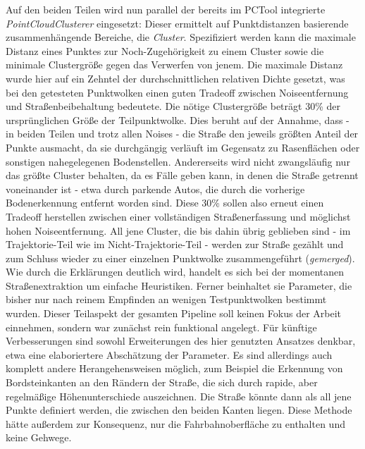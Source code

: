 Auf den beiden Teilen wird nun parallel der bereits im PCTool integrierte \textit{PointCloudClusterer} eingesetzt: Dieser ermittelt auf Punktdistanzen basierende zusammenhängende Bereiche, die \textit{Cluster}. Spezifiziert werden kann die maximale Distanz eines Punktes zur Noch-Zugehörigkeit zu einem Cluster sowie die minimale Clustergröße gegen das Verwerfen von jenem. 
Die maximale Distanz wurde hier auf ein Zehntel der durchschnittlichen relativen Dichte gesetzt, was bei den getesteten Punktwolken einen guten Tradeoff zwischen Noiseentfernung und Straßenbeibehaltung bedeutete. Die nötige Clustergröße beträgt 30\% der ursprünglichen Größe der Teilpunktwolke. Dies beruht auf der Annahme, dass - in beiden Teilen und trotz allen Noises - die Straße den jeweils größten Anteil der Punkte ausmacht, da sie durchgängig verläuft im Gegensatz zu Rasenflächen oder sonstigen nahegelegenen Bodenstellen. Andererseits wird nicht zwangsläufig nur das größte Cluster behalten, da es Fälle geben kann, in denen die Straße getrennt voneinander ist - etwa durch parkende Autos, die durch die vorherige Bodenerkennung entfernt worden sind. Diese 30\% sollen also erneut einen Tradeoff herstellen zwischen einer vollständigen Straßenerfassung und möglichst hohen Noiseentfernung. All jene Cluster, die bis dahin übrig geblieben sind - im Trajektorie-Teil wie im Nicht-Trajektorie-Teil - werden zur Straße gezählt und zum Schluss wieder zu einer einzelnen Punktwolke zusammengeführt (\textit{gemerged}). \\
Wie durch die Erklärungen deutlich wird, handelt es sich bei der momentanen Straßenextraktion um einfache Heuristiken. Ferner beinhaltet sie Parameter, die bisher nur nach reinem Empfinden an wenigen Testpunktwolken bestimmt wurden. Dieser Teilaspekt der gesamten Pipeline soll keinen Fokus der Arbeit einnehmen, sondern war zunächst rein funktional angelegt. Für künftige Verbesserungen sind sowohl Erweiterungen des hier genutzten Ansatzes denkbar, etwa eine elaboriertere Abschätzung der Parameter. Es sind allerdings auch komplett andere Herangehensweisen möglich, zum Beispiel die Erkennung von Bordsteinkanten an den Rändern der Straße, die sich durch rapide, aber regelmäßige Höhenunterschiede auszeichnen. Die Straße könnte dann als all jene Punkte definiert werden, die zwischen den beiden Kanten liegen. Diese Methode hätte außerdem zur Konsequenz, nur die Fahrbahnoberfläche zu enthalten und keine Gehwege. 

